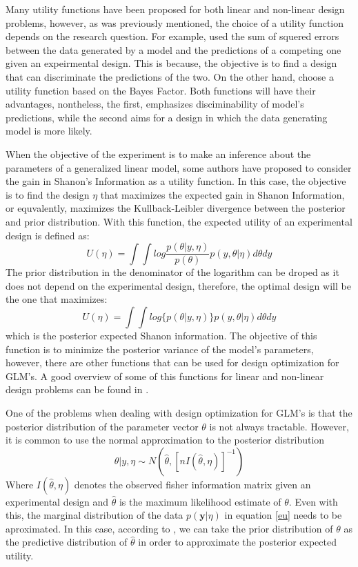 \documentclass[preprint,review,12pt]{elsarticle}
\begin{document}
Many utility functions have been proposed for both linear and non-linear design problems, however, as was previously mentioned, the choice of a utility function depends on the research question. For example, \cite{Myung2009} used the sum of squered errors between the data generated by a model and the predictions of a competing one given an expeirmental design. This is because, the objective is to find a design that can discriminate the predictions of the two. On the other hand, \cite{ZL2010} choose a utility function based on the Bayes Factor. Both functions will have their advantages, nontheless, the first, emphasizes disciminability of model's predictions, while the second aims for a design in which the data generating model is more likely.

When the objective of the experiment is to make an inference about the parameters of a generalized linear model, some authors \citep[e.g.][]{Ber1979} have proposed to consider the gain in Shanon's Information as a utility function. In this case, the objective is to find the design $\eta$ that maximizes the expected gain in Shanon Information, or equvalently, maximizes the Kullback-Leibler divergence between the posterior and prior distribution. With this function, the expected utility of an experimental design is defined as:
\begin{equation}
U(\eta)=\int \int log\frac{p(\theta|y,\eta)}{p(\theta)} p(y,\theta |\eta) d\theta dy
\label{klu}
\end{equation}
The prior distribution in the denominator of the logarithm can be droped as it does not depend on the experimental design, therefore, the optimal design will be the one that maximizes:
\begin{equation}
U(\eta)=\int \int log \{p(\theta|y,\eta)\} p(y,\theta |\eta) d\theta dy
\label{egShanon}
\end{equation}
which is the posterior expected Shanon information. The objective of this function is to minimize the posterior variance of the model's parameters, however, there are other functions that can be used for design optimization for GLM's. A good overview of some of this functions for linear and non-linear design problems can be found in \citet{ChalonerVerdinelli1995}. 

One of the problems when dealing with design optimization for GLM's is that the posterior distribution of the parameter vector $\theta$ is not always tractable. However, it is common to use the normal approximation to the posterior distribution
\begin{equation}
\theta|y,\eta \sim N\left(\hat{\theta},[nI(\hat{\theta},\eta)]^{-1}\right)
\label{Naprox}
\end{equation}
Where $I(\hat{\theta},\eta)$ denotes the observed fisher information matrix given an experimental design and $\hat{\theta}$ is the maximum likelihood estimate of $\theta$. Even with this, the marginal distribution of the data $p(\mathbf{y}|\eta)$ in equation \ref{eu} needs to be aproximated. In this case, according to \cite{chalar1989}, we can take the prior distribution of $\theta$ as the predictive distribution of $\hat{\theta}$ in order to approximate the posterior expected utility.
\end{document}
